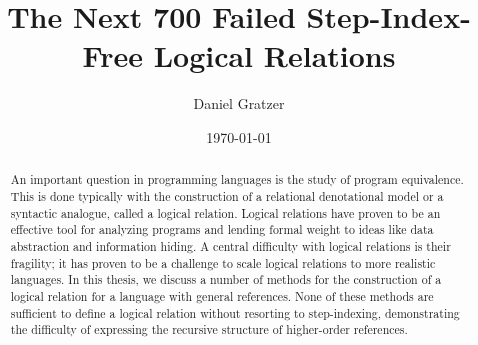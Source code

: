 \documentclass{amsart}
\title{The Next 700 Failed Step-Index-Free Logical Relations}
\author{Daniel Gratzer}
\date{\today}
\begin{document}
\begin{abstract}
  An important question in programming languages is the study of
  program equivalence. This is done typically with the construction of
  a relational denotational model or a syntactic analogue, called a
  logical relation. Logical relations have proven to be an effective
  tool for analyzing programs and lending formal weight to ideas like
  data abstraction and information hiding. A central difficulty with
  logical relations is their fragility; it has proven to be a
  challenge to scale logical relations to more realistic languages. In
  this thesis, we discuss a number of methods for the construction of
  a logical relation for a language with general references. None of
  these methods are sufficient to define a logical relation without
  resorting to step-indexing, demonstrating the difficulty of
  expressing the recursive structure of higher-order references.
\end{abstract}
\maketitle












\end{document}
